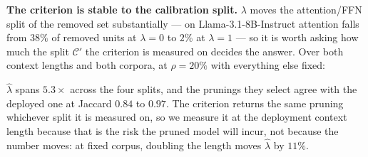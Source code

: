 \textbf{The criterion is stable to the calibration split.} $\lambda$ moves the attention/FFN split
of the removed set substantially --- on Llama-3.1-8B-Instruct attention falls from $38\%$ of removed
units at $\lambda\!=\!0$ to $2\%$ at $\lambda\!=\!1$ --- so it is worth asking how much the split
$\mathcal{C}'$ the criterion is measured on decides the answer. Over both context lengths and both
corpora, at $\rho{=}20\%$ with everything else fixed:

\begin{center}

\end{center}

\noindent $\hat\lambda$ spans $5.3\times$ across the four splits, and the prunings they select agree
with the deployed one at Jaccard $0.84$ to $0.97$. The criterion returns the same pruning whichever
split it is measured on, so we measure it at the deployment context length because that is the risk
the pruned model will incur, not because the number moves: at fixed corpus, doubling the length moves
$\hat\lambda$ by $11\%$.


